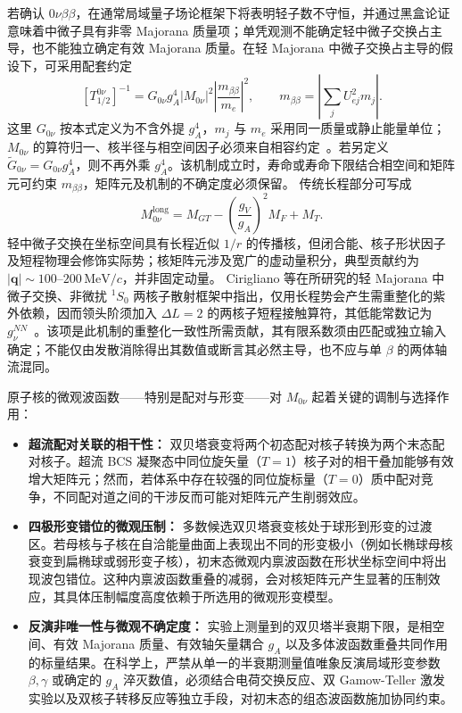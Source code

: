 若确认 $0\nu\beta\beta$，在通常局域量子场论框架下将表明轻子数不守恒，并通过黑盒论证意味着中微子具有非零 Majorana 质量项；单凭观测不能确定轻中微子交换占主导，也不能独立确定有效 Majorana 质量。在轻 Majorana 中微子交换占主导的假设下，可采用配套约定
\begin{equation}\label{eq:4-7-0nubb-halflife}
[T_{1/2}^{0\nu}]^{-1}=G_{0\nu}g_A^4|M_{0\nu}|^2\left|\frac{m_{\beta\beta}}{m_e}\right|^2,\qquad m_{\beta\beta}=\left|\sum_jU_{ej}^2m_j\right|.
\end{equation}
这里 $G_{0\nu}$ 按本式定义为不含外提 $g_A^4$，$m_j$ 与 $m_e$ 采用同一质量或静止能量单位；$M_{0\nu}$ 的算符归一、核半径与相空间因子必须来自相容约定~\cite{engel-menendez-2017-double-beta-matrix-elements-review}。若另定义 $\widetilde G_{0\nu}=G_{0\nu}g_A^4$，则不再外乘 $g_A^4$。该机制成立时，寿命或寿命下限结合相空间和矩阵元可约束 $m_{\beta\beta}$，矩阵元及机制的不确定度必须保留。
传统长程部分可写成
\begin{equation}\label{eq:4-7-NME-decomposition}
M_{0\nu}^{\mathrm{long}}=M_{GT}-\left(\frac{g_V}{g_A}\right)^2M_F+M_T.
\end{equation}
轻中微子交换在坐标空间具有长程近似 $1/r$ 的传播核，但闭合能、核子形状因子及短程物理会修饰实际势；核矩阵元涉及宽广的虚动量积分，典型贡献约为 $|\mathbf{q}|\sim100$--$200\,\mathrm{MeV}/c$，并非固定动量。
Cirigliano 等在所研究的轻 Majorana 中微子交换、非微扰 $^1S_0$ 两核子散射框架中指出，仅用长程势会产生需重整化的紫外依赖，因而领头阶须加入 $\Delta L=2$ 的两核子短程接触算符，其低能常数记为 $g_\nu^{NN}$~\cite{cirigliano-2018-leading-short-range-double-beta}。该项是此机制的重整化一致性所需贡献，其有限系数须由匹配或独立输入确定；不能仅由发散消除得出其数值或断言其必然主导，也不应与单 $\beta$ 的两体轴流混同。

原子核的微观波函数——特别是配对与形变——对 $M_{0\nu}$ 起着关键的调制与选择作用：
\begin{itemize}
\item \textbf{超流配对关联的相干性：} 双贝塔衰变将两个初态配对核子转换为两个末态配对核子。超流 BCS 凝聚态中同位旋矢量（$T=1$）核子对的相干叠加能够有效增大矩阵元；然而，若体系中存在较强的同位旋标量（$T=0$）质中配对竞争，不同配对道之间的干涉反而可能对矩阵元产生削弱效应。
\item \textbf{四极形变错位的微观压制：} 多数候选双贝塔衰变核处于球形到形变的过渡区。若母核与子核在自洽能量曲面上表现出不同的形变极小（例如长椭球母核衰变到扁椭球或弱形变子核），初末态微观内禀波函数在形状坐标空间中将出现波包错位。这种内禀波函数重叠的减弱，会对核矩阵元产生显著的压制效应，其具体压制幅度高度依赖于所选用的微观形变模型。
\item \textbf{反演非唯一性与微观不确定度：} 实验上测量到的双贝塔半衰期下限，是相空间、有效 Majorana 质量、有效轴矢量耦合 $g_A$ 以及多体波函数重叠共同作用的标量结果。在科学上，严禁从单一的半衰期测量值唯象反演局域形变参数 $\beta, \gamma$ 或确定的 $g_A$ 淬灭数值，必须结合电荷交换反应、双 Gamow-Teller 激发实验以及双核子转移反应等独立手段，对初末态的组态波函数施加协同约束。
\end{itemize}

